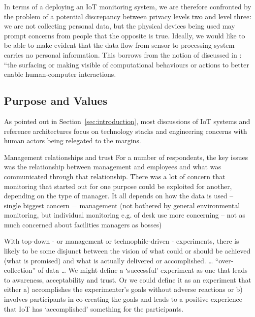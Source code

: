 In terms of a deploying an IoT monitoring system, we are therefore
confronted by the problem of a potential discrepancy between privacy
levels two and level three: we are not collecting personal data, but
the physical devices being used may prompt concerns from people that
the opposite is true. Ideally, we would like to be able to make
evident that the data flow from sensor to processing system carries no
personal information. This borrows from the notion of
 discussed in
\cite{Crabtree-2016-BAIT}: ``the surfacing or making visible of
computational behaviours or actions to better enable human-computer
interactions.

\subsection{Purpose and Values}
\label{sec:communication-values}

As pointed out in Section~\ref{sec:introduction}, most discussions of IoT
systems and reference architectures
\cite{Puschel-2016-WIAS,Heidt-2016-PGFT} focus on technology stacks
and engineering concerns with human actors being relegated to the
margins.

Management
relationships and trust For a number of respondents, the key issues
was the relationship between management and employees and what was
communicated through that relationship. There was a lot of concern
that monitoring that started out for one purpose could be exploited
for another, depending on the type of manager.  It all depends on how
the data is used – single biggest concern = management (not bothered
by general environmental monitoring, but individual monitoring e.g. of
desk use more concerning – not as much concerned about facilities
managers as bosses) 






With top-down - or management or technophile-driven - experiments,
there is likely to be some disjunct between the vision of what could
or should be achieved (what is promised) and what is actually
delivered or accomplished. … “over-collection” of data 
…
We might define a ‘successful’ experiment as one that leads to
awareness, acceptability and trust. Or we could define it as an
experiment that either a) accomplishes the experimenter’s goals
without adverse reactions or b) involves participants in co-creating
the goals and leads to a positive experience that IoT has
‘accomplished’ something for the participants.  

